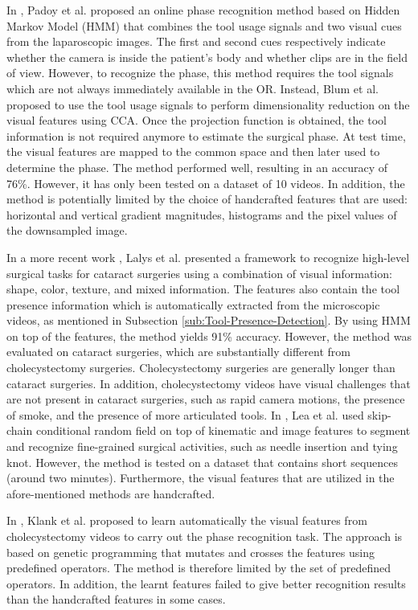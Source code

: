 \documentclass[journal]{IEEEtran} \usepackage{amssymb}
\begin{document}
In \cite{padoy_iaai2008}, Padoy et al. proposed an online
phase recognition method based on Hidden Markov Model (HMM) 
that combines the tool usage signals and two visual
cues from the laparoscopic images. The first and second cues respectively
indicate whether the camera is inside the patient's body and whether
clips are in the field of view. However, to recognize the phase, this
method requires the tool signals which are not always immediately available
in the OR. Instead, Blum et al. \cite{blum_miccai2010} proposed to use the tool usage signals to perform dimensionality reduction on the visual features using CCA. 
Once the projection function is obtained, the tool information is not
required anymore to estimate the surgical phase. At test time, the
visual features are mapped to the common space and then later used
to determine the phase. The method performed well, resulting in an accuracy of 76\%. However, 
it has only been tested on a dataset of 10 videos. In addition,
the method is potentially limited by the choice of handcrafted features
that are used: horizontal and vertical gradient magnitudes, histograms
and the pixel values of the downsampled image. 

In a more recent work \cite{lalys_tbme2012}, Lalys et al. presented
a framework to recognize high-level surgical tasks for cataract surgeries
using a combination of visual information: shape, color, texture,
and mixed information. The features also contain the tool presence
information which is automatically extracted from the microscopic videos,
as mentioned in Subsection \ref{sub:Tool-Presence-Detection}. By
using HMM on top of the features, the method yields 91\% accuracy.
However, the method was evaluated on cataract surgeries, which are
substantially different from cholecystectomy surgeries. Cholecystectomy
surgeries are generally longer than cataract surgeries. In addition,
cholecystectomy videos have visual challenges that are not present
in cataract surgeries, such as rapid camera motions, the presence of smoke, and
the presence of more articulated tools. In \cite{lea_wacv2015}, Lea et al. used 
skip-chain conditional random field on top of kinematic and image features 
to segment and recognize fine-grained surgical activities, such as needle 
insertion and tying knot. However, the method is tested on a dataset that 
contains short sequences (around two minutes). Furthermore, the visual
features that are utilized in the afore-mentioned methods are handcrafted. 

In \cite{klank_ijcars2008}, Klank et al. proposed to learn automatically the visual
features from cholecystectomy videos to carry out the
phase recognition task. The approach is based on genetic programming
that mutates and crosses the features using predefined operators. The method is therefore limited by the set of predefined
operators. In addition, the learnt features failed to give better
recognition results than the handcrafted features in some cases.
\end{document}
